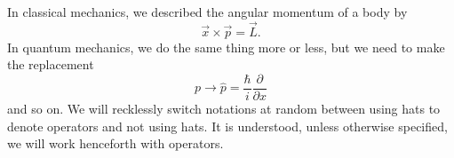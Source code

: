 
In classical mechanics, we described the angular momentum of a
body by 
\begin{equation}
\vec{x}\times\vec{p}=\vec{L}.
\end{equation}
In quantum mechanics, we do the same thing more or less, but we
need to make the replacement
\begin{equation}
p\to\widehat{p}=\frac{\hbar}{i}\frac{\partial}{\partial x}
\end{equation}
and so on. We will recklessly switch notations at random between
using hats to denote operators and not using hats. It is
understood, unless otherwise specified, we will work henceforth
with operators.

